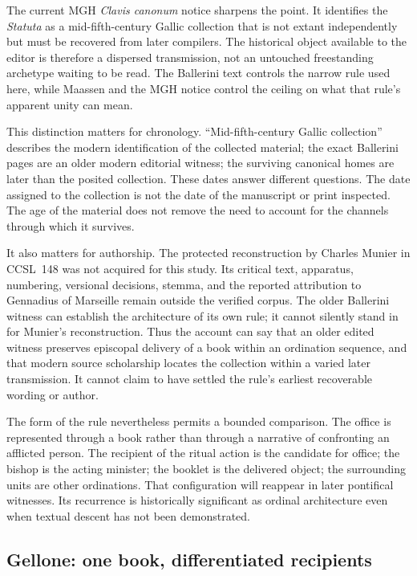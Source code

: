 The current MGH \emph{Clavis canonum} notice sharpens the point. It identifies
the \emph{Statuta} as a mid-fifth-century Gallic collection that is not extant
independently but must be recovered from later compilers. The historical
object available to the editor is therefore a dispersed transmission, not an
untouched freestanding archetype waiting to be read. The Ballerini text
controls the narrow rule used here, while Maassen and the MGH notice control
the ceiling on what that rule's apparent unity can mean.

This distinction matters for chronology. ``Mid-fifth-century Gallic
collection'' describes the modern identification of the collected material;
the exact Ballerini pages are an older modern editorial witness; the surviving
canonical homes are later than the posited collection. These dates answer
different questions. The date assigned to the collection is not the date of
the manuscript or print inspected. The age of the material does not remove
the need to account for the channels through which it survives.

It also matters for authorship. The protected reconstruction by Charles
Munier in CCSL~148 was not acquired for this study. Its critical text,
apparatus, numbering, versional decisions, stemma, and the reported
attribution to Gennadius of Marseille remain outside the verified corpus. The
older Ballerini witness can establish the architecture of its own rule; it
cannot silently stand in for Munier's reconstruction. Thus the account can
say that an older edited witness preserves episcopal delivery of a book within
an ordination sequence, and that modern source scholarship locates the
collection within a varied later transmission. It cannot claim to have
settled the rule's earliest recoverable wording or author.

The form of the rule nevertheless permits a bounded comparison. The office is
represented through a book rather than through a narrative of confronting an
afflicted person. The recipient of the ritual action is the candidate for
office; the bishop is the acting minister; the booklet is the delivered
object; the surrounding units are other ordinations. That configuration will
reappear in later pontifical witnesses. Its recurrence is historically
significant as ordinal architecture even when textual descent has not been
demonstrated.

\subsection{Gellone: one book, differentiated recipients}

